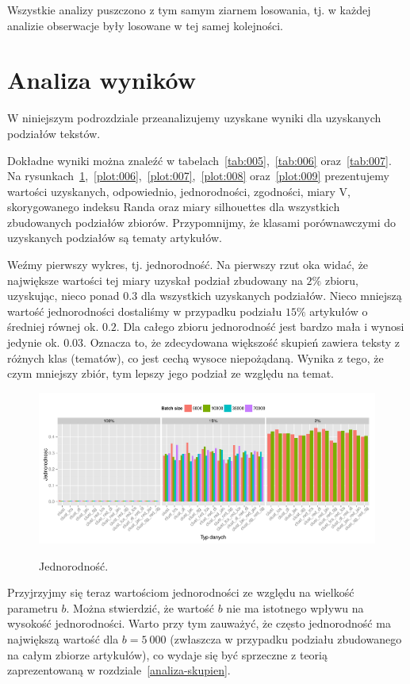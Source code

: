 \documentclass{praca1}
\begin{document}
Wszystkie analizy puszczono z tym samym ziarnem losowania, tj. w każdej analizie obserwacje były losowane w tej samej kolejności. 

\section{Analiza wyników}


W niniejszym podrozdziale przeanalizujemy uzyskane wyniki dla uzyskanych podziałów tekstów.

Dokładne wyniki można znaleźć w tabelach~\ref{tab:005},~\ref{tab:006} oraz~\ref{tab:007}. Na rysunkach~\ref{plot:005},~\ref{plot:006},~\ref{plot:007},~\ref{plot:008} oraz~\ref{plot:009} prezentujemy wartości uzyskanych, odpowiednio, jednorodności, zgodności, miary V, skorygowanego indeksu Randa oraz miary silhouettes dla wszystkich zbudowanych podziałów zbiorów. Przypomnijmy, że klasami porównawczymi do uzyskanych podziałów są tematy artykułów.

Weźmy pierwszy wykres, tj. jednorodność. Na pierwszy rzut oka widać, że największe wartości tej miary uzyskał podział zbudowany na $2\%$ zbioru, uzyskując, nieco ponad $0.3$ dla wszystkich uzyskanych podziałów. Nieco mniejszą wartość jednorodności dostaliśmy w przypadku podziału $15\%$ artykułów o średniej równej ok. $0.2$. Dla całego zbioru jednorodność jest bardzo mała i wynosi jedynie ok. $0.03$. Oznacza to, że zdecydowana większość skupień zawiera teksty z różnych klas (tematów), co jest cechą wysoce niepożądaną. Wynika z tego, że czym mniejszy zbiór, tym lepszy jego podział ze względu na temat.

\begin{figure}[!h]
  \centering
  \includegraphics[width=400pt]{plot10.pdf}\\
  \caption{Jednorodność.}\label{plot:005}
\end{figure}

Przyjrzyjmy się teraz wartościom jednorodności ze względu na wielkość parametru $b$. Można stwierdzić, że wartość $b$ nie ma istotnego wpływu na wysokość jednorodności. Warto przy tym zauważyć, że często jednorodność ma największą wartość dla $b=5\ 000$ (zwłaszcza w przypadku podziału zbudowanego na całym zbiorze artykułów), co wydaje się być sprzeczne z teorią zaprezentowaną w rozdziale~\ref{analiza-skupien}.
\end{document}
